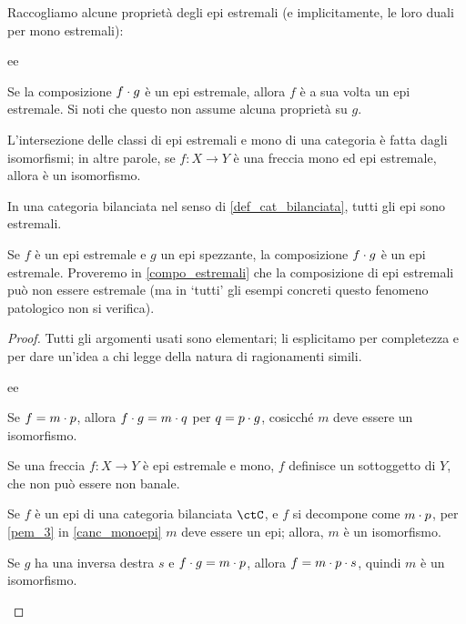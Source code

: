 \begin{proposition}
 Raccogliamo alcune proprietà degli epi estremali (e implicitamente, le loro duali per mono estremali):
 \begin{enumtag}{ee}
  \item \label{epie_1} Se la composizione \(f \cdot g\) è un epi estremale, allora \(f\) è a sua volta un epi estremale. Si noti che questo non assume alcuna proprietà su \(g\).
  \item \label{epie_2} L'intersezione delle classi di epi estremali e mono di una categoria è fatta dagli isomorfismi; in altre parole, se \(f \colon X\to Y\) è una freccia mono ed epi estremale, allora è un isomorfismo.
  \item \label{epie_3} In una categoria bilanciata nel senso di \ref{def_cat_bilanciata}, tutti gli epi sono estremali.
  \item \label{epie_4} Se \(f\) è un epi estremale e \(g\) un epi spezzante, la composizione \(f\cdot g\) è un epi estremale. Proveremo in \ref{compo_estremali} che la composizione di epi estremali può non essere estremale (ma in `tutti' gli esempi concreti questo fenomeno patologico non si verifica).
 \end{enumtag}
\end{proposition}
\begin{proof}
 Tutti gli argomenti usati sono elementari; li esplicitamo per completezza e per dare un'idea a chi legge della natura di ragionamenti simili.
 \begin{enumtag}{ee}
  \item Se \(f = m \cdot p\), allora \(f\cdot g = m\cdot q\) per \(q = p\cdot g\), cosicché \(m\) deve essere un isomorfismo.
  \item Se una freccia \(f \colon X\to Y\) è epi estremale e mono, \(f\) definisce un sottoggetto di \(Y\), che non può essere non banale.
  \item Se \(f\) è un epi di una categoria bilanciata \(\ctC\), e \(f\) si decompone come \(m\cdot p\), per \ref{pem_3} in \ref{canc_monoepi} \(m\) deve essere un epi; allora, \(m\) è un isomorfismo.
  \item Se \(g\) ha una inversa destra \(s\) e \(f\cdot g = m\cdot p\), allora \(f = m\cdot p\cdot s\), quindi \(m\) è un isomorfismo.\qedhere
 \end{enumtag}
\end{proof}

